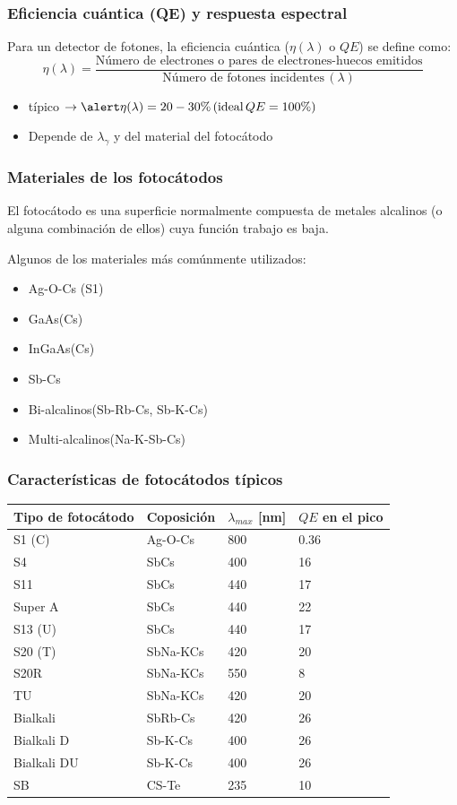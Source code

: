 \documentclass{beamer}
\begin{document}
\begin{frame}
\frametitle{Eficiencia cuántica (QE) y respuesta espectral}
Para un detector de fotones, la eficiencia cuántica ($\eta(\lambda)$ o $QE$) se define
como:
$$\eta(\lambda) = \frac{\text{Número de electrones o pares de electrones-huecos
emitidos}}{\text{Número de fotones incidentes}\,(\lambda)}$$

\begin{itemize}
\item típico $\rightarrow \alert{\eta(\lambda) = 20 - 30 \%}\, (\text{ideal}\, QE = 100 \%)$
\item Depende de $\lambda_{\gamma}$ y del material del fotocátodo
\end{itemize}
\end{frame}

\begin{frame}
\frametitle{Materiales de los fotocátodos}
\begin{block}{}
El fotocátodo es una superficie normalmente compuesta de metales alcalinos (o
alguna combinación de ellos) cuya \alert{función trabajo} es baja. 
\end{block}
Algunos de los materiales más comúnmente utilizados:
\begin{itemize}
\item Ag-O-Cs (S1)
\item GaAs(Cs)
\item InGaAs(Cs)
\item Sb-Cs
\item Bi-alcalinos(Sb-Rb-Cs, Sb-K-Cs)
\item Multi-alcalinos(Na-K-Sb-Cs)
\end{itemize}
\end{frame} 

\begin{frame}
\frametitle{Características de fotocátodos típicos}
\begin{tabular}{l l l l} \hline
\textbf{Tipo de fotocátodo} & \textbf{Coposición} & \textbf{$\lambda_{max}$
[nm]} & \textbf{$QE$ en el pico} \\ \hline
S1 (C)  & Ag-O-Cs & 800 & 0.36 \\
S4      & SbCs   & 400 & 16 \\
S11     & SbCs    & 440 & 17 \\
Super A & SbCs    & 440 & 22 \\
S13 (U) & SbCs   & 440 & 17 \\
S20 (T) & SbNa-KCs   & 420 & 20 \\
S20R    & SbNa-KCs & 550 & 8 \\
TU      & SbNa-KCs & 420 & 20 \\
Bialkali    & SbRb-Cs & 420 & 26 \\
Bialkali D  & Sb-K-Cs & 400 & 26 \\
Bialkali DU & Sb-K-Cs & 400 & 26 \\
SB          & CS-Te & 235 & 10 \\ \hline
\end{tabular}
\end{frame}
\end{document}

